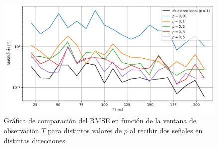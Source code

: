\begin{figure}[ht!]
    \centering
    \includegraphics[width=0.9\linewidth]{images/04-Random Sampling/rs_vs_T.png}
    \caption{Gráfica de comparación del RMSE en función de la ventana de observación $T$ para distintos valores de $p$ al recibir dos señales en distintas direcciones.}
    \label{fig:rs_vs_T}
\end{figure}
